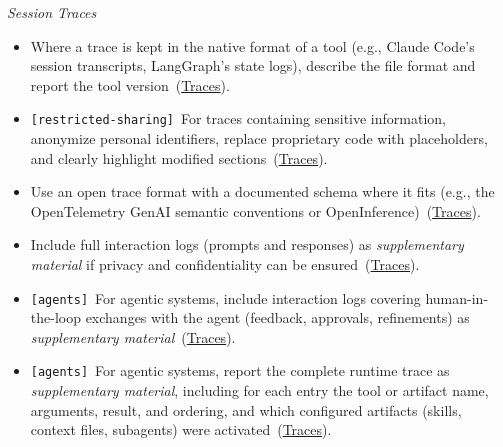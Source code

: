 \documentclass[smallextended]{svjour3}
\makeatletter
\newcommand{\must}{\textbf{must}\xspace}
\newcommand{\should}{\textbf{should}\xspace}
\newcommand{\supplementarymaterial}{\emph{supplementary material}\xspace}
\newcommand{\supplementarymaterial}{\emph{supplementary material}\xspace}
\newcommand{\iconM}{\usebox{\iconMbox}\xspace}
\newcommand{\iconS}{\usebox{\iconSbox}\xspace}
\newcommand{\iconM}{●\xspace}
\newcommand{\iconS}{○\xspace}
\newcommand{\condition}[1]{\texttt{\small[#1]}\,}
\newcommand{\condition}[1]{@@cond:#1@@}
\newcommand{\llmusage}{\hyperref[sec:studying-llm-usage-in-software-engineering]{\mbox{\emph{Studying LLM Usage}}}\xspace}
\newcommand{\llmusage}{\href{/study-types/usage/}{\emph{Studying LLM Usage}}\xspace}
\newcommand{\reftraces}{\hyperref[sec:report-session-traces]{Traces}}
\newcommand{\reftraces}{\href{/guidelines/traces/}{Traces}}
\makeatother
\begin{document}
\begin{appendices}
\noindent\textit{Session Traces}
\begin{itemize}[label={},leftmargin=*]
    \item \iconM Where a trace is kept in the native format of a tool (e.g., Claude Code's session transcripts, LangGraph's state logs), describe the file format and report the tool version~(\reftraces).
    \item \iconM \condition{restricted-sharing} For traces containing sensitive information, anonymize personal identifiers, replace proprietary code with placeholders, and clearly highlight modified sections~(\reftraces).
    \item \iconS Use an open trace format with a documented schema where it fits (e.g., the OpenTelemetry GenAI semantic conventions or OpenInference)~(\reftraces).
    \item \iconS Include full interaction logs (prompts and responses) as \supplementarymaterial if privacy and confidentiality can be ensured~(\reftraces).
    \item \iconS \condition{agents} For agentic systems, include interaction logs covering human-in-the-loop exchanges with the agent (feedback, approvals, refinements) as \supplementarymaterial~(\reftraces).
    \item \iconS \condition{agents} For agentic systems, report the complete runtime trace as \supplementarymaterial, including for each entry the tool or artifact name, arguments, result, and ordering, and which configured artifacts (skills, context files, subagents) were activated~(\reftraces).

\end{itemize}
\end{appendices}
\end{document}
